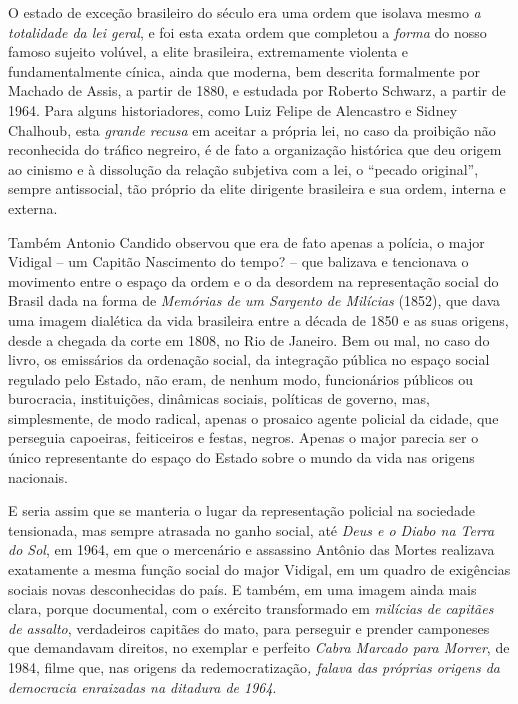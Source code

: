 O estado de exceção brasileiro do século  era uma ordem que isolava
mesmo \emph{a totalidade da lei geral}, e foi esta exata ordem que
completou a \emph{forma} do nosso famoso sujeito volúvel, a elite
brasileira, extremamente violenta e fundamentalmente cínica, ainda que
moderna, bem descrita formalmente por Machado de Assis, a partir de
1880, e estudada por Roberto Schwarz, a partir de 1964. Para alguns
historiadores, como Luiz Felipe de Alencastro e Sidney Chalhoub, esta
\emph{grande recusa} em aceitar a própria lei, no caso da proibição não
reconhecida do tráfico negreiro, é de fato a organização histórica que
deu origem ao cinismo e à dissolução da relação subjetiva com a lei, o
``pecado original'', sempre antissocial, tão próprio da elite dirigente
brasileira e sua ordem, interna e externa.

Também Antonio Candido observou que era de fato apenas a polícia, o
major Vidigal -- um Capitão Nascimento do tempo? -- que balizava e
tencionava o movimento entre o espaço da ordem e o da desordem na
representação social do Brasil dada na forma de \emph{Memórias de um
Sargento de Milícias} (1852), que dava uma imagem dialética da vida
brasileira entre a década de 1850 e as suas origens, desde a chegada da
corte em 1808, no Rio de Janeiro. Bem ou mal, no caso do livro, os
emissários da ordenação social, da integração pública no espaço social
regulado pelo Estado, não eram, de nenhum modo, funcionários públicos ou
burocracia, instituições, dinâmicas sociais, políticas de governo, mas,
simplesmente, de modo radical, apenas o prosaico agente policial da
cidade, que perseguia capoeiras, feiticeiros e festas, negros. Apenas o
major parecia ser o único representante do espaço do Estado sobre o
mundo da vida nas origens nacionais.

E seria assim que se manteria o lugar da representação policial na
sociedade tensionada, mas sempre atrasada no ganho social, até
\emph{Deus e o Diabo na Terra do Sol}, em 1964, em que o mercenário e
assassino Antônio das Mortes realizava exatamente a mesma função social
do major Vidigal, em um quadro de exigências sociais novas desconhecidas
do país. E também, em uma imagem ainda mais clara, porque documental,
com o exército transformado em \emph{milícias de} \emph{capitães de
assalto}, verdadeiros capitães do mato, para perseguir e prender
camponeses que demandavam direitos, no exemplar e perfeito \emph{Cabra
Marcado para Morrer}, de 1984, filme que, nas origens da
redemocratização\emph{, falava das próprias origens da democracia
enraizadas na ditadura de 1964}.

